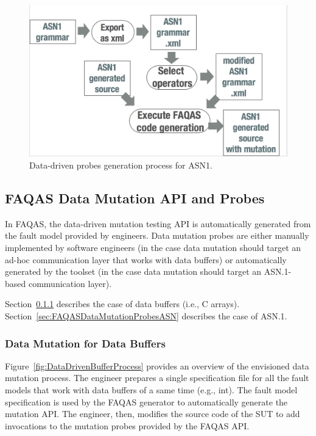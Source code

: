 \begin{figure}[h]
  \centering
    \includegraphics[width=12cm]{images/ASN1mutationProces}
      \caption{Data-driven probes generation process for ASN1.}
      \label{fig:ASN1ProbesGeneration}
\end{figure}








\clearpage
\subsection{FAQAS Data Mutation API and Probes}
\label{sec:FAQASDataMutationProbes}

In FAQAS, the data-driven mutation testing API is automatically generated from the fault model provided by engineers. Data mutation probes are either manually implemented by software engineers (in the case data mutation should target an ad-hoc communication layer that works with data buffers) or automatically generated by the toolset (in the case data mutation should target an ASN.1-based communication layer).

Section~\ref{sec:FAQASDataMutationProbesBuffer} describes the case of data buffers (i.e., C arrays).
Section~\ref{sec:FAQASDataMutationProbesASN} describes the case of ASN.1.


\subsubsection{Data Mutation for Data Buffers}
\label{sec:FAQASDataMutationProbesBuffer}

Figure~\ref{fig:DataDrivenBufferProcess} provides an overview of the envisioned data mutation process. 
The engineer prepares a single specification file for all the fault models that work with data buffers of a same time (e.g., int). The fault model specification is used by the FAQAS generator to automatically generate the mutation API. The engineer, then, modifies the source code of the SUT to add invocations to the mutation probes provided by the FAQAS API. 


